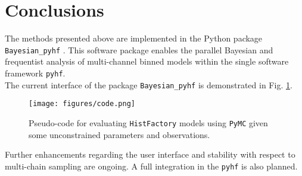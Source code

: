 \section{Conclusions}\label{sec:conclusions}

The methods presented above are implemented in the Python package \texttt{Bayesian\_pyhf} \cite{BayesianPyhf}. This software package enables the parallel Bayesian and frequentist analysis of multi-channel binned models within the single software framework \texttt{pyhf}. \\
The current interface of the package \texttt{Bayesian\_pyhf} is demonstrated in Fig. \ref{code}. 
    \begin{figure} %
        \centering
        \texttt{[image: figures/code.png]}
        \centering
        \caption{Pseudo-code for evaluating \texttt{HistFactory} models using \texttt{PyMC} given some unconstrained parameters and observations.}
        \label{code}
    \end{figure}
\noindent Further enhancements regarding the user interface and stability with respect to multi-chain sampling are ongoing. A full integration in the \texttt{pyhf} is also planned.